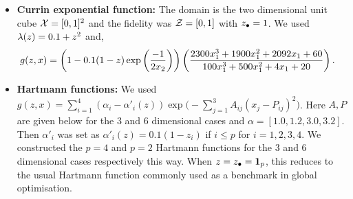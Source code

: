 \begin{itemize}[leftmargin=0.0in]

\item[]
\textbf{Currin exponential function:}
The domain is the two dimensional unit cube $\mathcal{X} = [0,1]^2$ and the fidelity 
was $\mathcal{Z} = [0, 1]$ with $z_{\bullet} = 1$.
We used $\lambda(z) = 0.1 + z^2$ and,
\begin{align*}
g(z, x) &= \left(1-0.1(1-z)\exp\left(\frac{-1}{2x_2}\right)\right)
  \left(\frac{2300x_1^3 + 1900x_1^2 + 2092x_1 + 60}{100x_1^3 + 
  500x_1^2 + 4x_1 + 20}\right).
\end{align*}

\item[]
\textbf{Hartmann functions:}
We used 
$g(z,x) = \sum_{i=1}^4 (\alpha_i - \alpha'_i(z)) \exp\big( -\sum_{j=1}^3 A_{ij}
(x_j-P_{ij})^2\big)$.
Here $A, P$ are given below for the $3$ and $6$ dimensional cases and
$\alpha = [1.0, 1.2, 3.0, 3.2]$.
Then $\alpha'_i$ was set as $\alpha'_i(z) = 0.1(1 - z_i)$ if $i\leq p$ for
$i=1,2,3,4$.
We constructed the $p=4$ and $p=2$ Hartmann functions for the $3$ and $6$ dimensional
cases respectively this way.
When $z = z_{\bullet} = {\bf 1}_p$, this reduces to the usual Hartmann function commonly used
as a benchmark in global optimisation.


\end{itemize}
